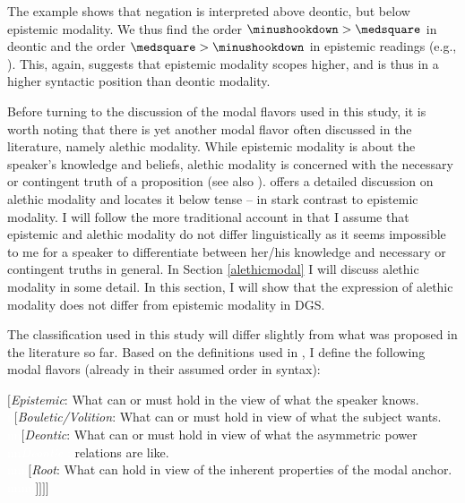 \noindent The example shows that negation is interpreted above deontic, but below epistemic modality. We thus find the order $\minushookdown > \medsquare$ in deontic and the order $ \medsquare > \minushookdown$ in epistemic readings (e.g., \citealt{butler2003minimalist, iatridou2010scopal}). This, again, suggests that epistemic modality scopes higher, and is thus in a higher syntactic position than deontic modality.

Before turning to the discussion of the modal flavors used in this study, it is worth noting that there is yet another modal flavor often discussed in the literature, namely alethic modality. While epistemic modality is about the speaker's knowledge and beliefs, alethic modality is concerned with the necessary or contingent truth of a proposition (see also \citealt[28]{nuyts2000epistemic}). \citet{cinque1999adverbs} offers a detailed discussion on alethic modality and locates it below tense -- in stark contrast to epistemic modality. I will follow the more traditional account in that I assume that epistemic and alethic modality do not differ linguistically as it seems impossible to me for a speaker to differentiate between her/his knowledge and necessary or contingent truths in general. In Section \ref{alethicmodal} I will discuss alethic modality in some detail. In this section, I will show that the expression of alethic modality does not differ from epistemic modality in DGS.

The classification used in this study will differ slightly from what was proposed in the literature so far. Based on the definitions used in \citet{bross2017swabian}, I define the following modal flavors (already in their assumed order in syntax):

\begin{exe}
\ex\label{bsp:differentmodalitiesused} 
{\footnotesize $[$\textit{Epistemic}: What can or must hold in the view of what the speaker knows. \\
\textcolor{white}{n}$[$\textit{Bouletic/Volition}: What can or must hold in view of what the subject wants. \\
\textcolor{white}{nn}$[$\textit{Deontic}: What can or must hold in view of what the asymmetric power  \\
\textcolor{white}{nn\textit{Deontic} : }relations are like.\\
\textcolor{white}{nnn}$[$\textit{Root}: What can hold in view of the inherent properties of the modal anchor. \\
\textcolor{white}{nnnn}$]]]]$ }
\end{exe} 

